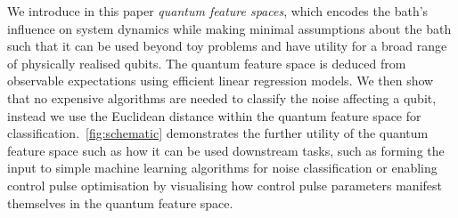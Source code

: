 \documentclass[12pt]{iopart}
\begin{document}
We introduce in this paper \textit{quantum feature spaces}, which encodes the bath's influence on system dynamics while making minimal assumptions about the bath such that it can be used beyond toy problems and have utility for a broad range of physically realised qubits. The quantum feature space is deduced from observable expectations using efficient linear regression models. We then show that no expensive algorithms are needed to classify the noise affecting a qubit, instead we use the Euclidean distance within the quantum feature space for classification.~\cref{fig:schematic} demonstrates the further utility of the quantum feature space such as how it can be used downstream tasks, such as forming the input to simple machine learning algorithms for noise classification or enabling control pulse optimisation by visualising how control pulse parameters manifest themselves in the quantum feature space.



\end{document}

